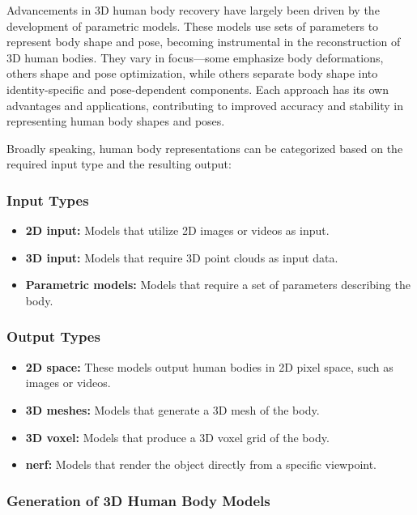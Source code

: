 Advancements in 3D human body recovery have largely been driven by the
development of parametric models. These models use sets of parameters to
represent body shape and pose, becoming instrumental in the reconstruction of
3D human bodies. They vary in focus—some emphasize body deformations, others
shape and pose optimization, while others separate body shape into
identity-specific and pose-dependent components. Each approach has its own
advantages and applications, contributing to improved accuracy and stability in
representing human body shapes and poses.

Broadly speaking, human body representations can be categorized based on the
required input type and the resulting output:

\subsubsection{Input Types}

\begin{itemize}
	\item \textbf{2D input:} Models that utilize 2D images or videos as input.
	\item \textbf{3D input:} Models that require 3D point clouds as input data.
	\item \textbf{Parametric models:} Models that require a set of parameters describing the body.
\end{itemize}

\subsubsection{Output Types}

\begin{itemize}
	\item \textbf{2D space:} These models output human bodies in 2D pixel space, such as images or videos.
	\item \textbf{3D meshes:} Models that generate a 3D mesh of the body.
	\item \textbf{3D voxel:} Models that produce a 3D voxel grid of the body.
	\item \textbf{\gls{nerf}:} Models that render the object directly from a specific viewpoint.
\end{itemize}

\subsubsection{Generation of 3D Human Body Models}

